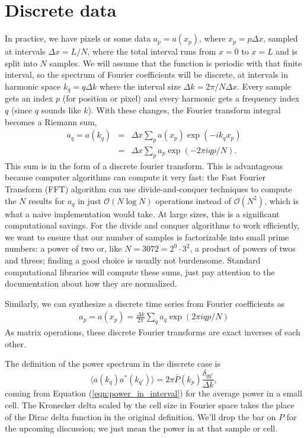 \section{Discrete data}

In practice, we have pixels or some data $a_p = a(x_p)$, where $x_p = p\Delta x$, sampled at intervals $\Delta x = L/N$, where the total interval runs from $x=0$ to $x=L$ and is split into $N$ samples.     We will assume that the function is periodic with that finite interval, so the spectrum of Fourier coefficients will be discrete, at intervals in harmonic space $k_q = q\Delta k$ where the interval size $\Delta k = 2\pi/N\Delta x$.  Every sample gets an index $p$ (for position or pixel) and every harmonic gets a frequency index $q$ (since $q$ sounds like $k$).  With these changes, the Fourier transform integral becomes a Riemann sum,
\begin{eqnarray}%
  a_q = a(k_q) & = & \Delta x \sum_p a(x_p) \exp(- i k_q  x_p) \\
  & = & \Delta x \sum_p a_p \exp(-2\pi i qp/N). \label{eqn:dft}
\end{eqnarray}
 This sum is in the form of a discrete fourier transform.  This is advantageous because computer algorithms can compute it very fast: the Fast Fourier Transform (FFT) algorithm can use divide-and-conquer techniques to compute the $N$ results for $a_q$  in just ${\mathcal O}(N \log N)$ operations instead of ${\mathcal O}(N^2)$, which is what a naive implementation would take.  At large sizes, this is a significant computational savings.  For the divide and conquer algorithms to work efficiently, we want to ensure that our number of samples is factorizable into small prime numbers: a power of two or, like $N = 3072 = 2^9 \cdot 3^2$, a product of powers of twos and threes; finding a good choice is usually not burdensome.  Standard computational libraries will compute these sums, just pay attention to the documentation about how they are normalized.

 Similarly, we can synthesize a discrete time series from Fourier coefficients as
 \begin{eqnarray}
   a_p = a(x_p) = \frac{\Delta k}{2\pi}  \sum_q a_q \exp(2\pi i qp/N) \label{eqn:idft}
 \end{eqnarray}
 As matrix operations, these discrete Fourier transforms are exact inverses of each other.

The definition of the power spectrum in the discrete case is
 \begin{equation}
   \langle a(k_q) a^*(k_{q'}) \rangle = 2\pi \bar P(k_p) \frac{\delta_{qq'}}{\Delta k}, \label{eqn:power_spectrum_definition_discrete}
  \end{equation}
 coming from Equation (\ref{eqn:power_in_interval}) for the average power in a small cell.  The Kronecker delta scaled by the cell size in Fourier space takes the place of the Dirac delta function in the original definition.  We'll drop the bar on $P$ for the upcoming discussion; we just mean the power in at that sample or cell.



